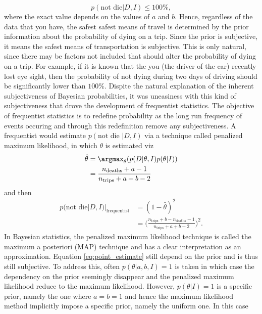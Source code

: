 \begin{example}
	\begin{equation}
		p(\text{not die}|D,I)\leq 100\%,
		\label{eq:abe1}
	\end{equation}
	where the exact value depends on the values of $a$ and $b$. Hence, regardless of the data that you have, the safest safest means of travel is determined by the prior information about the probability of dying on a trip. Since the prior is subjective, it means the safest means of transportation is subjective. This is only natural, since there may be factors not included that should alter the probability of dying on a trip. For example, if it is known that the you (the driver of the car) recently lost eye sight, then the probability of not dying during two days of driving should be significantly lower than $100\%$. Dispite the natural explanation of the inherent subjectiveness of Bayesian probabilities, it was uneasiness with this kind of subjectiveness that drove the development of frequentist statistics. The objective of frequentist statistics is to redefine probability as the long run frequency of events occuring and through this redefinition remove any subjectiveness. A frequentist would estimate $p(\text{not die }|D,I)$ via a technique called penalized maximum likelihood, in which $\theta$ is estimated viz 
	\begin{equation}
		\begin{split}
			\hat{\theta} &= \argmax_{\theta}(p(D|\theta,I)p(\theta|I))\\
			& = \frac{n_{\text{deaths}}+a-1}{n_{\text{trips}}+a+b-2}
		\end{split}
		\label{pll}
	\end{equation}
	and then
	\begin{equation}
		\begin{split}
			p(\text{not die}|D,I)|_{\text{frequentist}} & = (1-\hat{\theta})^2\\
			&= \bigg(\frac{n_{\text{trips}}+b-n_{\text{deaths}}-1}{n_{\text{trips}}+a+b-2}\bigg)^2.
		\end{split}
		\label{eq:point_estimate}
	\end{equation}  
	In Bayesian statistics, the penalized maximum likelihood technique is called the maximum a posteriori (MAP) technique and has a clear interpretation as an approximation. Equation \eqref{eq:point_estimate} still depend on the prior and is thus still subjective. To address this, often $p(\theta|a,b,I)=1$ is taken in which case the dependency on the prior seemingly disappear and the penalized maximum likelihood reduce to the maximum likelihood. However, $p(\theta|I)=1$ is a specific prior, namely the one where $a=b=1$ and hence the maximum likelihood method implicitly impose a specific prior, namely the uniform one. In this case

\end{example}
